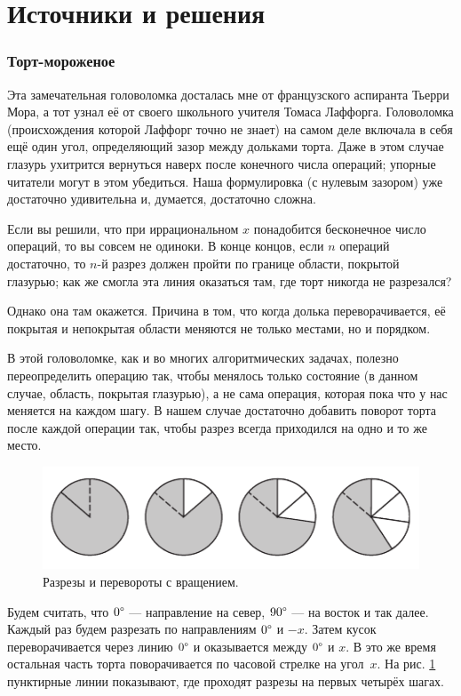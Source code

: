 \section*{Источники и решения}

\subsubsection*{Торт-мороженое}

Эта замечательная головоломка досталась мне от французского аспиранта Тьерри Мора,
а тот узнал её от своего школьного учителя Томаса Лаффорга.
Головоломка (происхождения которой Лаффорг точно не знает) на самом деле включала в себя ещё один угол, определяющий зазор между дольками торта.
Даже в этом случае глазурь ухитрится вернуться наверх после конечного числа операций;
упорные читатели могут в этом убедиться.
Наша формулировка (с нулевым зазором) уже достаточно удивительна и, думается, достаточно сложна.

Если вы решили, что при иррациональном $x$ понадобится бесконечное число операций, то вы совсем не одиноки.
В конце концов, если $n$ операций достаточно, то $n$-й разрез должен пройти по границе области, покрытой глазурью;
как же смогла эта линия оказаться там, где торт никогда не разрезался?

Однако она там окажется.
Причина в том, что когда долька переворачивается, её покрытая и непокрытая области  меняются не только местами, но и порядком.

В этой головоломке, как и во многих алгоритмических задачах, полезно переопределить операцию так, чтобы менялось только состояние (в данном случае, область, покрытая глазурью), а не сама операция, которая пока что у нас меняется на каждом шагу.
В нашем случае достаточно добавить поворот торта после каждой операции так, чтобы разрез всегда приходился на одно и то же место.


\begin{figure}[htb!]
\centering
\includegraphics[scale=.9]{pics/tort2}
\caption{Разрезы и перевороты с вращением.}
\label{pic:tort2}
\end{figure}

Будем считать, что $0\degree$ --- направление на север,
$90\degree$ --- на восток и так далее.
Каждый раз будем разрезать по направлениям $0\degree$ и $-x$.
Затем кусок переворачивается через линию $0\degree$ и оказывается между $0\degree$ и $x$.
В это же время остальная часть торта поворачивается по часовой стрелке на угол~$x$.
На рис. \ref{pic:tort2} пунктирные линии показывают, где проходят разрезы на первых четырёх шагах.

